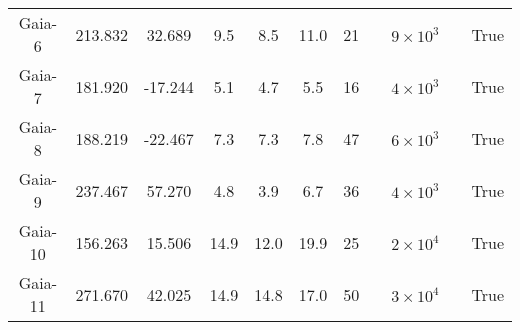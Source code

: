 \begin{table}
\begin{tabular}{ccccccccccc}
Gaia-6 & 213.832 & 32.689 & 9.5 & 8.5 & 11.0 & 21 & \citet{ibata:2023} & $9 \times 10^{3}$ &  & True \\
Gaia-7 & 181.920 & -17.244 & 5.1 & 4.7 & 5.5 & 16 & \citet{ibata:2023} & $4 \times 10^{3}$ &  & True \\
Gaia-8 & 188.219 & -22.467 & 7.3 & 7.3 & 7.8 & 47 & \citet{ibata:2023} & $6 \times 10^{3}$ &  & True \\
Gaia-9 & 237.467 & 57.270 & 4.8 & 3.9 & 6.7 & 36 & \citet{ibata:2023} & $4 \times 10^{3}$ &  & True \\
Gaia-10 & 156.263 & 15.506 & 14.9 & 12.0 & 19.9 & 25 & \citet{ibata:2023} & $2 \times 10^{4}$ &  & True \\
Gaia-11 & 271.670 & 42.025 & 14.9 & 14.8 & 17.0 & 50 & \citet{ibata:2023} & $3 \times 10^{4}$ &  & True \\
\hline \hline
\end{tabular}
\end{table}
